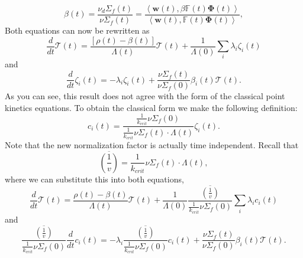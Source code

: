 \documentclass{ansconf}
\numberwithin{equation}{section}
\begin{document}
\begin{equation}
\beta\left(t\right)=\frac{\nu_{d}\Sigma_{f}\left(t\right)}{\nu\Sigma_{f}\left(t\right)}=\frac{\left\langle \mathbf{w}\left(t\right),\beta\mathbb{F}\left(t\right)\boldsymbol{\Phi}\left(t\right)\right\rangle }{\left\langle \mathbf{w}\left(t\right),\mathbb{F}\left(t\right)\boldsymbol{\Phi}\left(t\right)\right\rangle },
\end{equation}
 Both equations can now be rewritten as
\begin{equation}
\frac{d}{dt}\mathcal{T}\left(t\right)=\frac{\left[\rho\left(t\right)-\beta\left(t\right)\right]}{\Lambda\left(t\right)}\mathcal{T}\left(t\right)+\frac{1}{\Lambda\left(0\right)}\sum_{i}\lambda_{i}\zeta_{i}\left(t\right)
\end{equation}
and
\begin{equation}
\frac{d}{dt}\zeta_{i}\left(t\right)=-\lambda_{i}\zeta_{i}\left(t\right)+\frac{\nu\Sigma_{f}\left(t\right)}{\nu\Sigma_{f}\left(0\right)}\beta_{i}\left(t\right)\mathcal{T}\left(t\right)\label{eq:newC}.
\end{equation}
As you can see, this result does not agree with the form of the classical
point kinetics equations. To obtain the classical form we make the
following definition:
\begin{equation}
c_{i}\left(t\right)=\frac{\frac{1}{k_{crit}}\nu\Sigma_{f}\left(0\right)}{\frac{1}{k_{crit}}\nu\Sigma_{f}\left(t\right)\cdot\Lambda\left(t\right)}\zeta_{i}\left(t\right).
\end{equation}
Note that the new normalization factor is actually time independent.
Recall that
\begin{equation}
\overline{\left(\frac{1}{v}\right)}=\frac{1}{k_{crit}}\nu\Sigma_{f}\left(t\right)\cdot\Lambda\left(t\right),
\end{equation}
where we can substitute this into both equations,
\begin{equation}
\frac{d}{dt}\mathcal{T}\left(t\right)=\frac{\rho\left(t\right)-\beta\left(t\right)}{\Lambda\left(t\right)}\mathcal{T}\left(t\right)+\frac{1}{\Lambda\left(0\right)}\frac{\overline{\left(\frac{1}{v}\right)}}{\frac{1}{k_{crit}}\nu\Sigma_{f}\left(0\right)}\sum_{i}\lambda_{i}c_{i}\left(t\right)
\end{equation}
and
\begin{equation}
\frac{\overline{\left(\frac{1}{v}\right)}}{\frac{1}{k_{crit}}\nu\Sigma_{f}\left(0\right)}\frac{d}{dt}c_{i}\left(t\right)=-\lambda_{i}\frac{\overline{\left(\frac{1}{v}\right)}}{\frac{1}{k_{crit}}\nu\Sigma_{f}\left(0\right)}c_{i}\left(t\right)+\frac{\nu\Sigma_{f}\left(t\right)}{\nu\Sigma_{f}\left(0\right)}\beta_{i}\left(t\right)\mathcal{T}\left(t\right).
\end{equation}
\end{document}
